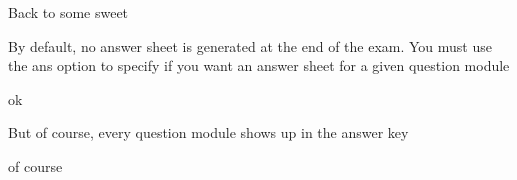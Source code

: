 \documentclass{exam}
\begin{document}
\begin{questions}
\setcounter{question}{33}
\question Back to some sweet
\question By default, no answer sheet is generated at the end of the exam. You must use the ans option to specify if you want an answer sheet for a given question module
	\begin{solution}[20 pt]
	ok
	\end{solution}
\question But of course, every question module shows up in the answer key
	\begin{solution}[20 pt]
	of course
	\end{solution}
\end{questions}
\newpage
\end{document}
